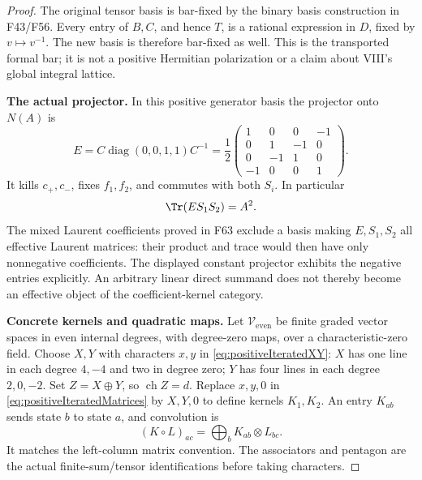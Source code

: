 \documentclass[11pt,a4paper]{article}
\newcommand{\fid}[1]{\textsf{#1}}\newcommand{\gate}[1]{\textsf{#1}}
\theoremstyle{named}\newtheorem{finding}{Finding}[section]
\theoremstyle{definition}\newtheorem{definition}[finding]{Definition}
\theoremstyle{remark}\newtheorem{remark}[finding]{Remark}
\begin{document}
\begin{proof}
The original tensor basis is bar-fixed by the binary
basis construction in \fid{F43}/\fid{F56}.
Every entry of \(B,C\), and hence \(T\), is a
rational expression in \(D\), fixed by
\(v\mapsto v^{-1}\). The new basis is therefore
bar-fixed as well. This is the transported formal bar;
it is not a positive Hermitian polarization or a
claim about VIII's global integral lattice.

\par\smallskip\noindent\textbf{The actual projector.}\quad
In this positive generator basis the projector onto
\(N(A)\) is
\begin{equation}\label{eq:positiveIteratedProjector}
 E=C\operatorname{diag}(0,0,1,1)C^{-1}
  =\frac12\begin{pmatrix}
   1&0&0&-1\\0&1&-1&0\\0&-1&1&0\\-1&0&0&1
  \end{pmatrix}.
\end{equation}
It kills \(c_+,c_-\), fixes \(f_1,f_2\), and
commutes with both \(S_i\). In particular
\[
                         \Tr(ES_1S_2)=A^2.
\]
The mixed Laurent coefficients proved in \fid{F63}
exclude a basis making \(E,S_1,S_2\) all effective
Laurent matrices: their product and trace would then
have only nonnegative coefficients.
The displayed constant projector exhibits the
negative entries explicitly.
An arbitrary linear direct summand does not thereby
become an effective object of the coefficient-kernel
category.

\par\smallskip\noindent\textbf{Concrete kernels and quadratic maps.}\quad
Let \(\mathcal V_{\mathrm{even}}\) be finite graded
vector spaces in even internal degrees, with
degree-zero maps, over a characteristic-zero field.
Choose \(X,Y\) with characters \(x,y\) in
\eqref{eq:positiveIteratedXY}:
\(X\) has one line in each degree \(4,-4\) and
two in degree zero; \(Y\) has four lines in each
degree \(2,0,-2\).
Set \(Z=X\oplus Y\), so \(\operatorname{ch}Z=d\).
Replace \(x,y,0\) in
\eqref{eq:positiveIteratedMatrices} by \(X,Y,0\)
to define kernels \(K_1,K_2\).
An entry \(K_{ab}\) sends state \(b\) to state
\(a\), and convolution is
\begin{equation}\label{eq:positiveIteratedConvolution}
                   (K\circ L)_{ac}
                         =\bigoplus_b K_{ab}\otimes L_{bc}.
\end{equation}
It matches the left-column matrix convention.
The associators and pentagon are the actual
finite-sum/tensor identifications before taking
characters.


\end{proof}
\end{document}
